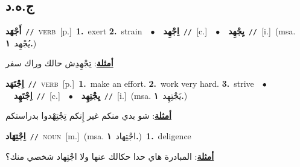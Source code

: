 \documentclass[10pt,a4paper,twoside]{article} %
\begin{document}
\begin{multicols}{2}
\vspace{-3mm}
\subsection*{\color{blue}\foreignlanguage{arabic}{ج.ه.د}\color{blue}{}} 

{\setlength\topsep{0pt}\textbf{\foreignlanguage{arabic}{أَجْهَد}}\ {\color{gray}\texttt{//}\color{black}}\ \textsc{verb}\ [p.]\ \textbf{1.}~exert  \textbf{2.}~strain\ \ $\bullet$\ \ \setlength\topsep{0pt}\textbf{\foreignlanguage{arabic}{اِجْهِد}}\ {\color{gray}\texttt{//}\color{black}}\ [c.]\ \ $\bullet$\ \ \setlength\topsep{0pt}\textbf{\foreignlanguage{arabic}{يِجْهِد}}\ {\color{gray}\texttt{//}\color{black}}\ [i.]\ \color{gray}(msa. \foreignlanguage{arabic}{يُجْهِد}~\foreignlanguage{arabic}{\textbf{١.}})\color{black}\  \begin{flushright}\color{gray}\foreignlanguage{arabic}{\textbf{\underline{\foreignlanguage{arabic}{أمثلة}}}: تِجْهِدِش حالك وراك سفر}\end{flushright}\color{black}} \vspace{2mm}

{\setlength\topsep{0pt}\textbf{\foreignlanguage{arabic}{اِجْتَهَد}}\ {\color{gray}\texttt{//}\color{black}}\ \textsc{verb}\ [p.]\ \textbf{1.}~make an effort.  \textbf{2.}~work very hard.  \textbf{3.}~strive\ \ $\bullet$\ \ \setlength\topsep{0pt}\textbf{\foreignlanguage{arabic}{اِجْتَهِد}}\ {\color{gray}\texttt{//}\color{black}}\ [c.]\ \ $\bullet$\ \ \setlength\topsep{0pt}\textbf{\foreignlanguage{arabic}{يِجْتِهِد}}\ {\color{gray}\texttt{//}\color{black}}\ [i.]\ \color{gray}(msa. \foreignlanguage{arabic}{يَجْتِهِد}~\foreignlanguage{arabic}{\textbf{١.}})\color{black}\  \begin{flushright}\color{gray}\foreignlanguage{arabic}{\textbf{\underline{\foreignlanguage{arabic}{أمثلة}}}: شو بدي منكم غير إِنكم تِجْتِهْدوا بدراستكم}\end{flushright}\color{black}} \vspace{2mm}

{\setlength\topsep{0pt}\textbf{\foreignlanguage{arabic}{اِجْتِهَاد}}\ {\color{gray}\texttt{//}\color{black}}\ \textsc{noun}\ [m.]\ \color{gray}(msa. \foreignlanguage{arabic}{اجْتِهاد}~\foreignlanguage{arabic}{\textbf{١.}})\color{black}\ \textbf{1.}~deligence\  \begin{flushright}\color{gray}\foreignlanguage{arabic}{\textbf{\underline{\foreignlanguage{arabic}{أمثلة}}}: المبادرة هاي حدا حكالك عنها ولا اجْتِهاد شخصي منك؟}\end{flushright}\color{black}} \vspace{2mm}


\end{multicols}
\end{document}
